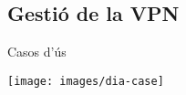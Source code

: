\subsection{Gestió de la VPN}
    \begin{frame}{Casos d'ús}
        \begin{center}
        \texttt{[image: images/dia-case]}
        \end{center}
    \end{frame}
